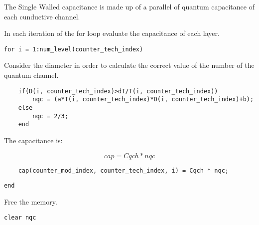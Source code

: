 \begin{par}
The Single Walled capacitance is made up of a parallel of quantum capacitance of each cunductive channel.
\end{par} \vspace{1em}
\begin{par}
In each iteration of the for loop evaluate the capacitance of each layer.
\end{par} \vspace{1em}
\begin{verbatim}
for i = 1:num_level(counter_tech_index)
\end{verbatim}
\begin{par}
Consider the diameter in order to calculate the correct value of the number of the quantum channel.
\end{par} \vspace{1em}
\begin{verbatim}
    if(D(i, counter_tech_index)>dT/T(i, counter_tech_index))
        nqc = (a*T(i, counter_tech_index)*D(i, counter_tech_index)+b);
    else
        nqc = 2/3;
    end
\end{verbatim}
\begin{par}
The capacitance is:
\end{par} \vspace{1em}
\begin{par}
$$cap = Cqch * nqc$$
\end{par} \vspace{1em}
\begin{verbatim}
	cap(counter_mod_index, counter_tech_index, i) = Cqch * nqc;
\end{verbatim}
\begin{verbatim}
end
\end{verbatim}
\begin{par}
Free the memory.
\end{par} \vspace{1em}
\begin{verbatim}
clear nqc
\end{verbatim}